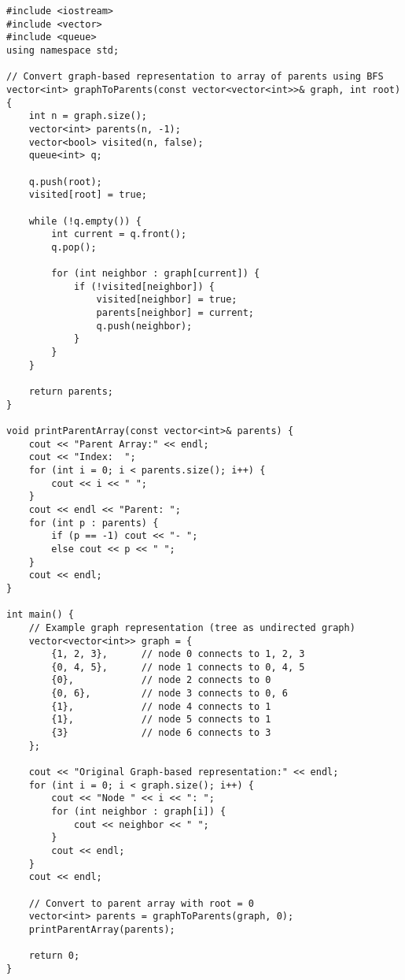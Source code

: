 \documentclass[12pt]{article}
\begin{document}
\begin{lstlisting}[caption={Chuyển đổi từ Graph-based Representation sang Array of Parents}]
#include <iostream>
#include <vector>
#include <queue>
using namespace std;

// Convert graph-based representation to array of parents using BFS
vector<int> graphToParents(const vector<vector<int>>& graph, int root) {
    int n = graph.size();
    vector<int> parents(n, -1);
    vector<bool> visited(n, false);
    queue<int> q;
    
    q.push(root);
    visited[root] = true;
    
    while (!q.empty()) {
        int current = q.front();
        q.pop();
        
        for (int neighbor : graph[current]) {
            if (!visited[neighbor]) {
                visited[neighbor] = true;
                parents[neighbor] = current;
                q.push(neighbor);
            }
        }
    }
    
    return parents;
}

void printParentArray(const vector<int>& parents) {
    cout << "Parent Array:" << endl;
    cout << "Index:  ";
    for (int i = 0; i < parents.size(); i++) {
        cout << i << " ";
    }
    cout << endl << "Parent: ";
    for (int p : parents) {
        if (p == -1) cout << "- ";
        else cout << p << " ";
    }
    cout << endl;
}

int main() {
    // Example graph representation (tree as undirected graph)
    vector<vector<int>> graph = {
        {1, 2, 3},      // node 0 connects to 1, 2, 3
        {0, 4, 5},      // node 1 connects to 0, 4, 5
        {0},            // node 2 connects to 0
        {0, 6},         // node 3 connects to 0, 6
        {1},            // node 4 connects to 1
        {1},            // node 5 connects to 1
        {3}             // node 6 connects to 3
    };
    
    cout << "Original Graph-based representation:" << endl;
    for (int i = 0; i < graph.size(); i++) {
        cout << "Node " << i << ": ";
        for (int neighbor : graph[i]) {
            cout << neighbor << " ";
        }
        cout << endl;
    }
    cout << endl;
    
    // Convert to parent array with root = 0
    vector<int> parents = graphToParents(graph, 0);
    printParentArray(parents);
    
    return 0;
}
\end{lstlisting}
\end{document}
